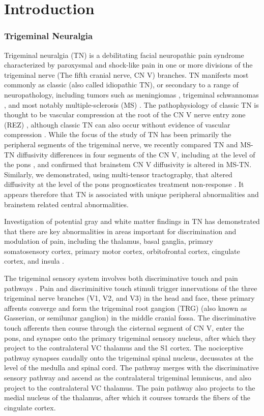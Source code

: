 \section{Introduction}
\subsubsection{Trigeminal Neuralgia}
Trigeminal neuralgia (TN) is a debilitating facial neuropathic pain syndrome characterized by paroxysmal and shock-like pain in one or more divisions of the trigeminal nerve (The fifth cranial nerve, CN V) branches. TN manifests most commonly as classic (also called idiopathic TN), or secondary to a range of neuropathology, including tumors such as meningiomas \cite{Cheng2008}, trigeminal schwannomas \cite{Miller2008}, and most notably multiple-sclerosis (MS) \cite{Cruccu2009,VanderMeijs2002,Nick2012}. The pathophysiology of classic TN is thought to be vascular compression at the root of the CN V nerve entry zone (REZ) \cite{Linn2011,Love2001}, although classic TN can also occur without evidence of vascular compression \cite{Lee2014}. While the focus of the study of TN has been primarily the peripheral segments of the trigeminal nerve, we recently compared TN and MS-TN diffusivity differences in four segments of the CN V, including at the level of the pons \cite{Chen2016a}, and confirmed that brainstem CN V diffusivity is altered in MS-TN. Similarly, we demonstrated, using multi-tensor tractography, that altered diffusivity at the level of the pons prognosticates treatment non-response \cite{Hung2017}. It appears therefore that TN is associated with unique peripheral abnormalities and brainstem related central abnormalities. 

Investigation of potential gray and white matter findings in TN has demonstrated that there are key abnormalities in areas important for discrimination and modulation of pain, including the thalamus, basal ganglia, primary somatosensory cortex, primary motor cortex, orbitofrontal cortex, cingulate cortex, and insula \cite{Desouza2013c, Desouza2013}.

The trigeminal sensory system involves both discriminative touch and pain pathways \cite{Henssen2016}.  Pain and discriminitive touch stimuli trigger innervations of the three trigeminal nerve branches (V1, V2, and V3) in the head and face, these primary affrents converge and form the trigeminal root gangion (TRG) (also known as Gasserian, or semilunar ganglion) in the middle cranial fossa. The discriminative touch afferents then course through the cisternal segment of CN V, enter the pons, and synapse onto the primary trigeminal sensory nucleus, after which they project to the contralateral VC thalamus and the S1 cortex. The nociceptive pathway synapses caudally onto the trigeminal spinal nucleus, decussates at the level of the medulla and spinal cord. The pathway merges with the discriminative sensory pathway and ascend as the contralateral trigeminal lemniscus, and also project to the contralateral VC thalamus. The pain pathway also projects to the medial nucleus of the thalamus, after which it courses towards the fibers of the cingulate cortex. 

